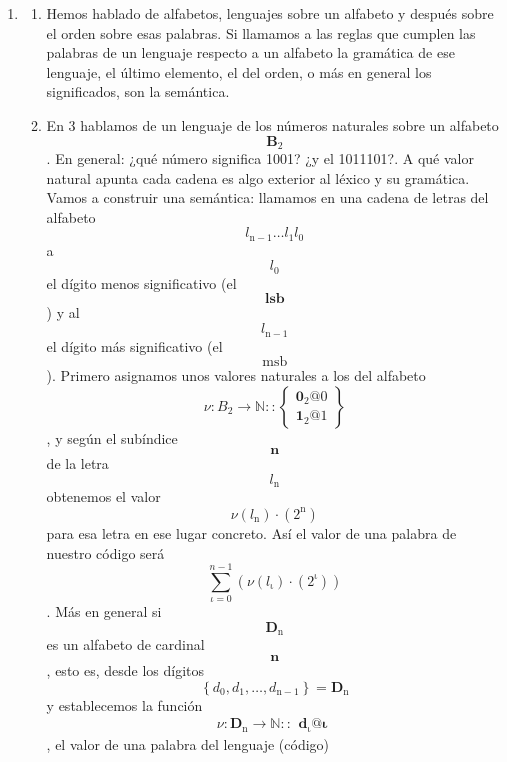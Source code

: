 \begin{enumerate}
\def\labelenumi{\arabic{enumi}.}
\setcounter{enumi}{1}
\item
  \begin{enumerate}
  \def\labelenumii{\arabic{enumii}.}
  \item
    Hemos hablado de alfabetos, lenguajes sobre un alfabeto y después
    sobre el orden sobre esas palabras. Si llamamos a las reglas que
    cumplen las palabras de un lenguaje respecto a un alfabeto la
    gramática de ese lenguaje, el último elemento, el del orden, o más
    en general los significados, son la semántica.
  \item
    En 3 hablamos de un lenguaje de los números naturales sobre un
    alfabeto \[\mathbf{B}_{\mathbf{\mathrm{2}}}\]. En general: ¿qué
    número significa 1001? ¿y el 1011101?. A qué valor natural apunta
    cada cadena es algo exterior al léxico y su gramática. Vamos a
    construir una semánti\-ca: llamamos en una cadena de letras del
    alfabeto
    \[l_{\mathbf{\mathrm{n - 1}}}\ldots l_{\mathbf{\mathrm{1}}}l_{\mathbf{\mathrm{0}}}\]a
    \[l_{\mathbf{\mathrm{0}}}\]el dígito me\-nos significativo
    (el\[\mathbf{lsb}\]) y al\[l_{\mathbf{\mathrm{n - 1}}}\]el dígito
    más significativo (el \[\mathbf{\mathrm{msb}}\]). Pri\-mero
    asignamos unos valores naturales a los del alfabeto
    \[\nu:{B_{\mathbf{\mathrm{2}}}\rightarrow\mathbf{\mathbb{N}}}::\begin{Bmatrix}
    {\mathbf{0_{\mathrm{2}}}@0} \\
    {\mathbf{1_{\mathrm{2}}}@1}
    \end{Bmatrix}\], y según el subíndice \[\mathbf{n}\] de la letra
    \[l_{\mathbf{\mathrm{n}}}\] obtenemos el valor
    \[\nu{{(l_{\mathbf{\mathrm{n}}})} \cdot {(2^{\mathbf{\mathrm{n}}})}}\]
    para esa letra en ese lugar concreto. Así el valor de una palabra de
    nuestro código será
    \[\sum\limits_{\iota = 0}^{n - 1}{({\nu{{(l_{\mathbf{\mathrm{\iota}}})} \cdot {(2^{\mathbf{\mathrm{\iota}}})}}})}\].
    Más en general si \[\mathbf{D}_{\mathbf{\mathrm{n}}}\]es un alfabeto
    de cardinal \[\mathbf{n}\], esto es, desde los dígitos
    \[\left\{ {d_{\mathbf{\mathrm{0}}},d_{\mathbf{\mathrm{1}}},\ldots,d_{\mathbf{\mathrm{n - 1}}}} \right\} = \mathbf{D}_{\mathbf{\mathrm{n}}}\]y
    establecemos la función
    \[\nu:{\mathbf{D}_{\mathbf{\mathrm{n}}}\rightarrow\mathbf{\mathbb{N}}}::\begin{matrix}
    {\mathbf{d_{\mathrm{\iota}}}@\mathbf{\iota}}
    \end{matrix}\], el valor de una palabra del lenguaje (código)

\end{enumerate}
\end{enumerate}
